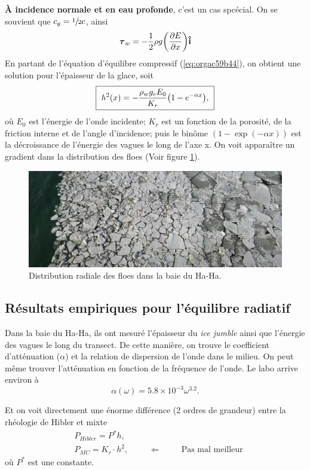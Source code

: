 \documentclass[10pt]{article}
\numberwithin{equation}{section}
\newcommand{\ivf}{\vb{\hat{i}}}
\begin{document}
\textbf{À incidence normale et en eau profonde}, c'est un cas spcécial.
On se souvient que \(c_g = \sfrac{1}{2} c\), ainsi
\begin{equation}
   \boldsymbol{\tau}_w = -\frac{1}{2}\rho g \qty(\pdv{E}{x}) \ivf
\end{equation}
En partant de l'équation d'équilibre compressif (\ref{eq:orgac59b44}), on obtient une solution pour l'épaisseur de la glace, soit
\begin{equation}
   \boxed{\ h^2(x) = - \frac{\rho_w g_e E_0}{K_r}\qty(1-e^{-\alpha x}),\ }
\end{equation}
où \(E_0\) est l'énergie de l'onde incidente; \(K_r\) est un fonction de la porosité, de la friction interne et de l'angle d'incidence; puis le binôme \((1-\exp(-\alpha x))\) est la décroissance de l'énergie des vagues le long de l'axe x.
On voit apparaître un gradient dans la distribution des floes (Voir figure \ref{fig:org5b95aa9}).

\begin{figure}[htbp]
\centering
\includegraphics[width=.9\linewidth]{Figures/photos/gradient_floes.png}
\caption{\label{fig:org5b95aa9}Distribution radiale des floes dans la baie du Ha-Ha.}
\end{figure}
\subsection{Résultats empiriques pour l'équilibre radiatif}
\label{sec:org4a5c5ca}

Dans la baie du Ha-Ha, ils ont mesuré l'épaisseur du \emph{ice jumble} ainsi que l'énergie des vagues le long du transect.
De cette manière, on trouve le coefficient d'atténuation (\(\alpha\))  et la relation de dispersion de l'onde dans le milieu.
On peut même trouver l'atténuation en fonction de la fréquence de l'onde.
Le labo arrive environ à
\begin{equation}
   \alpha(\omega)  = 5.8 \times 10^{-3} \omega^{3.2}.
\end{equation}

Et on voit directement une énorme différence (2 ordres de grandeur) entre la rhéologie de Hibler et mixte
\begin{align}
   &P_{Hibler} = P^* h,\\
   &P_{MC} = K_r \cdot h^2, \hspace{1cm}\Leftarrow\hspace{1cm}\text{Pas mal meilleur}
\end{align}
où \(P^*\) est une constante.
\end{document}
